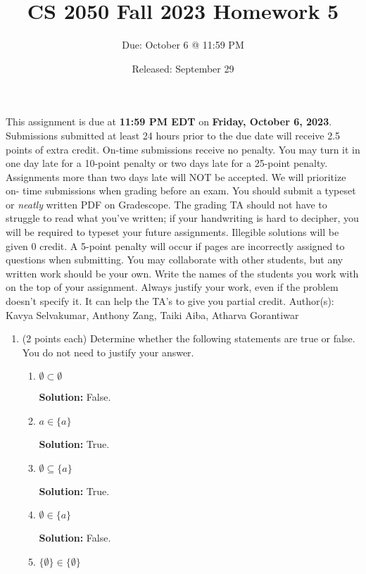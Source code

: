 \documentclass[11pt]{article}
\title{CS 2050 Fall 2023 Homework 5}
\author{Due: October 6 @ 11:59 PM}
\date{Released: September 29}
\newcommand{\pte}[1]{\textcolor{maincolor}{(#1 points each)}}
\begin{document}
\maketitle
\begin{justify}
This assignment is due at \textbf{11:59 PM EDT} on \textbf{Friday, October 6,
2023}. Submissions submitted at least 24 hours prior to the due date will receive
2.5 points of extra credit. On-time submissions receive no penalty. You may turn it
in one day late for a 10-point penalty or two days late for a 25-point penalty.
Assignments more than two days late will NOT be accepted. We will prioritize on-
time submissions when grading before an exam.
\bigskip
You should submit a typeset or \emph{neatly} written PDF on Gradescope. The
grading TA should not have to struggle to read what you've written; if your
handwriting is hard to decipher, you will be required to typeset your future
assignments. Illegible solutions will be given 0 credit. A 5-point penalty will
occur if pages are incorrectly assigned to questions when submitting.
\bigskip
You may collaborate with other students, but any written work should be your own.
Write the names of the students you work with on the top of your assignment.
\bigskip
Always justify your work, even if the problem doesn't specify it. It can help the
TA's to give you partial credit.
\bigskip
Author(s): Kavya Selvakumar, Anthony Zang, Taiki Aiba, Atharva Gorantiwar
\clearpage
\begin{enumerate}
\item \pte{2} Determine whether the following statements are true or false. You
do not need to justify your answer.
\begin{enumerate}
\item $\emptyset \subset \emptyset$
\begin{mdframed}
    \textbf{Solution:} False.
\end{mdframed}
\item $a \in \{a\} $
\begin{mdframed}
    \textbf{Solution:} True. 
\end{mdframed}
\item $\emptyset \subseteq \{a\}$
\begin{mdframed}
    \textbf{Solution:} True.
\end{mdframed}
\item $\emptyset \in \{a\}$
\begin{mdframed}
    \textbf{Solution:} False.
\end{mdframed}
\item $\{\emptyset\} \in \{\emptyset\}$

\end{enumerate}
\end{enumerate}
\end{justify}
\end{document}
